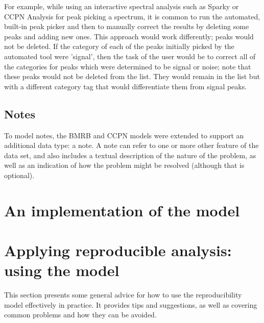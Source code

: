 For example, while using an interactive spectral analysis such as Sparky or
CCPN Analysis \cite{sparky, ccpn} for peak picking a spectrum, it is common
to run the automated, built-in peak picker and then to manually correct the
results by deleting some peaks and adding new ones.  This approach would
work differently; peaks would not be deleted.  If the category of each of the
peaks initially picked by the automated tool were 'signal', then the task of
the user would be to correct all of the categories for peaks which were 
determined to be signal or noise; note that these peaks would not be deleted
from the list.  They would remain in the list but with a different category
tag that would differentiate them from signal peaks.


\subsection{Notes}
To model notes, the BMRB and CCPN models \cite{bmrb, ccpn} were extended
to support an additional data type: a note.  A note can refer to one or more
other feature of the data set, and also includes a textual description of
the nature of the problem, as well as an indication of how the problem might
be resolved (although that is optional).



\section{An implementation of the model}


\section{Applying reproducible analysis: using the model}
This section presents some general advice for how to use the reproducibility
model effectively in practice.  It provides tips and suggestions, as well
as covering common problems and how they can be avoided.

